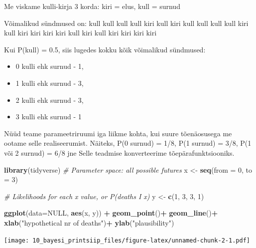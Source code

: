 \documentclass[]{book}
\newenvironment{Shaded}{\begin{snugshade}}{\end{snugshade}}
\newcommand{\CommentTok}[1]{\textcolor[rgb]{0.56,0.35,0.01}{\textit{#1}}}
\newcommand{\DataTypeTok}[1]{\textcolor[rgb]{0.13,0.29,0.53}{#1}}
\newcommand{\DecValTok}[1]{\textcolor[rgb]{0.00,0.00,0.81}{#1}}
\newcommand{\KeywordTok}[1]{\textcolor[rgb]{0.13,0.29,0.53}{\textbf{#1}}}
\newcommand{\NormalTok}[1]{#1}
\newcommand{\OperatorTok}[1]{\textcolor[rgb]{0.81,0.36,0.00}{\textbf{#1}}}
\newcommand{\OtherTok}[1]{\textcolor[rgb]{0.56,0.35,0.01}{#1}}
\newcommand{\StringTok}[1]{\textcolor[rgb]{0.31,0.60,0.02}{#1}}
\providecommand{\tightlist}{%
  \setlength{\itemsep}{0pt}\setlength{\parskip}{0pt}}
\begin{document}
Me viskame kulli-kirja 3 korda: kiri = elus, kull = surnud

Võimalikud sündmused on:
\textbar{} kull kull kull
\textbar{} kull kiri kull
\textbar{} kiri kull kull
\textbar{} kull kull kiri
\textbar{} kull kiri kiri
\textbar{} kiri kiri kull
\textbar{} kiri kull kiri
\textbar{} kiri kiri kiri

Kui P(kull) = 0.5, siis lugedes kokku kõik võimalikud sündmused:

\begin{itemize}
\tightlist
\item
  0 kulli ehk surnud - 1,
\item
  1 kulli ehk surnud - 3,
\item
  2 kulli ehk surnud - 3,
\item
  3 kulli ehk surnud - 1
\end{itemize}

Nüüd teame parameetriruumi iga liikme kohta, kui suure tõenäosusega me ootame selle realiseerumist. Näiteks, P(0 surnud) = 1/8, P(1 surnud) = 3/8, P(1 või 2 surnud) = 6/8 jne
Selle teadmise konverteerime tõepärafunktsiooniks.

\begin{Shaded}
\begin{Highlighting}[]
\KeywordTok{library}\NormalTok{(tidyverse)}
\CommentTok{# Parameter space: all possible futures}
\NormalTok{x <-}\StringTok{ }\KeywordTok{seq}\NormalTok{(}\DataTypeTok{from =} \DecValTok{0}\NormalTok{, }\DataTypeTok{to =} \DecValTok{3}\NormalTok{)}

\CommentTok{# Likelihoods for each x value, or P(deaths I x)}
\NormalTok{y <-}\StringTok{ }\KeywordTok{c}\NormalTok{(}\DecValTok{1}\NormalTok{, }\DecValTok{3}\NormalTok{, }\DecValTok{3}\NormalTok{, }\DecValTok{1}\NormalTok{)}

\KeywordTok{ggplot}\NormalTok{(}\DataTypeTok{data=}\OtherTok{NULL}\NormalTok{, }\KeywordTok{aes}\NormalTok{(x, y)) }\OperatorTok{+}\StringTok{ }
\StringTok{  }\KeywordTok{geom_point}\NormalTok{()}\OperatorTok{+}\StringTok{ }
\StringTok{  }\KeywordTok{geom_line}\NormalTok{()}\OperatorTok{+}
\StringTok{  }\KeywordTok{xlab}\NormalTok{(}\StringTok{"hypothetical nr of deaths"}\NormalTok{)}\OperatorTok{+}\StringTok{ }
\StringTok{  }\KeywordTok{ylab}\NormalTok{(}\StringTok{"plausibility"}\NormalTok{)}
\end{Highlighting}
\end{Shaded}

\texttt{[image: 10\_bayesi\_printsiip\_files/figure-latex/unnamed-chunk-2-1.pdf]}
\end{document}
